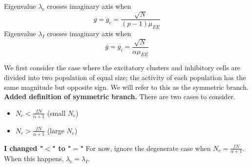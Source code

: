 \documentclass[11pt,reqno]{amsart}
\begin{document}
Eigenvalue $\lambda_c$ crosses imaginary axis when 
\[
g = g_c = \frac{\sqrt{N}}{(p-1)\mu_{EE}}
\]
Eigenvalue $\lambda_I$ crosses imaginary axis when
\[
g = g_i = \frac{\sqrt{N}}{\alpha \mu_{EE}}
\]

We first consider the case where the excitatory clusters and inhibitory cells are divided into two population of equal size; the activity of each population has the same magnitude but opposite sign. We will refer to this as the symmetric branch. \textbf{Added definition of symmetric branch.} There are two cases to consider.
\begin{itemize}
    \item $N_c < \frac{fN}{\alpha+1}$ (small $N_c$)
    \item $N_c > \frac{fN}{\alpha+1}$ (large $N_c$)
\end{itemize}
\textbf{I changed "$<$" to "$=$" }
For now, ignore the degenerate case when $N_c = \frac{fN}{\alpha+1}$. When this happens, $\lambda_c = \lambda_I$.
\end{document}
